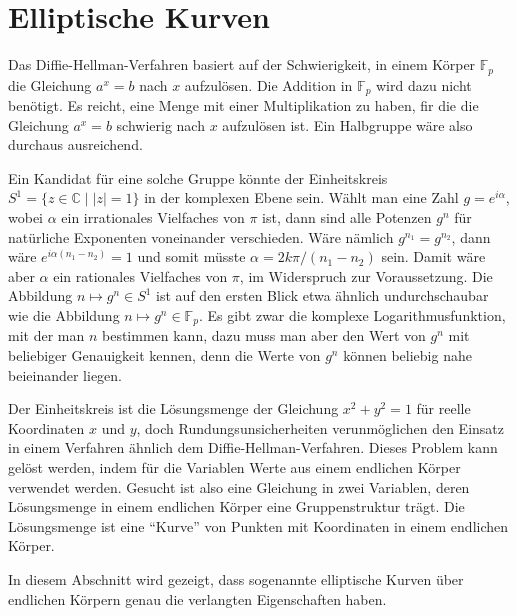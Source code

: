 %
%
%
\section{Elliptische Kurven
\label{buch:section:elliptische-kurven}}
%
Das Diffie-Hellman-Verfahren basiert auf der Schwierigkeit, in einem 
Körper $\mathbb{F}_p$ die Gleichung $a^x=b$ nach $x$ aufzulösen.
Die Addition in $\mathbb{F}_p$ wird dazu nicht benötigt.
Es reicht, eine Menge mit einer Multiplikation zu haben, fir die
die Gleichung $a^x=b$ schwierig nach $x$ aufzulösen ist.
Ein Halbgruppe wäre also durchaus ausreichend.

Ein Kandidat für eine solche Gruppe könnte der Einheitskreis
$S^1=\{z\in\mathbb{C} \mid |z|=1\}$ in der komplexen Ebene sein.
Wählt man eine Zahl $g=e^{i\alpha}$, wobei $\alpha$ ein irrationales
Vielfaches von $\pi$ ist, dann sind alle Potenzen $g^n$ für natürliche
Exponenten voneinander verschieden.
Wäre nämlich $g^{n_1}=g^{n_2}$, dann wäre $e^{i\alpha(n_1-n_2)}=1$ und
somit müsste $\alpha=2k\pi/(n_1-n_2)$ sein.
Damit wäre aber $\alpha$ ein rationales Vielfaches von $\pi$, im Widerspruch
zur Voraussetzung.
Die Abbildung $n\mapsto g^n\in S^1$ ist auf den ersten Blick etwa ähnlich
undurchschaubar wie die Abbildung $n\mapsto g^n\in\mathbb{F}_p$.
Es gibt zwar die komplexe Logarithmusfunktion, mit der man $n$ bestimmen
kann, dazu muss man aber den Wert von $g^n$ mit beliebiger Genauigkeit
kennen, denn die Werte von $g^n$ können beliebig nahe beieinander liegen.

Der Einheitskreis ist die Lösungsmenge der Gleichung $x^2+y^2=1$ für
reelle Koordinaten $x$ und $y$,
doch Rundungsunsicherheiten verunmöglichen den Einsatz in einem 
Verfahren ähnlich dem Diffie-Hellman-Verfahren.
Dieses Problem kann gelöst werden, indem für die Variablen Werte
aus einem endlichen Körper verwendet werden.
Gesucht ist also eine Gleichung in zwei Variablen, deren Lösungsmenge
in einem endlichen Körper eine Gruppenstruktur trägt.
Die Lösungsmenge ist eine ``Kurve'' von Punkten mit
%
Koordinaten in einem endlichen Körper.

In diesem Abschnitt wird gezeigt, dass sogenannte elliptische Kurven
über endlichen Körpern genau die verlangten Eigenschaften haben.

